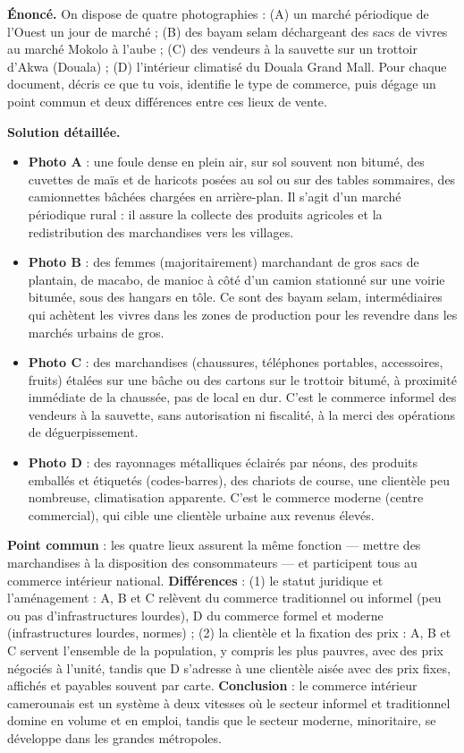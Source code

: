 \documentclass[11pt]{article}
\newcommand{\cle}[1]{{\popxbold\color{popdark}#1}}
\begin{document}
\begin{exoresolu}
\textbf{Énoncé.} On dispose de quatre photographies : (A) un marché périodique de l'Ouest un jour de marché ; (B) des bayam selam déchargeant des sacs de vivres au marché Mokolo à l'aube ; (C) des vendeurs à la sauvette sur un trottoir d'Akwa (Douala) ; (D) l'intérieur climatisé du Douala Grand Mall. Pour chaque document, décris ce que tu vois, identifie le type de commerce, puis dégage un point commun et deux différences entre ces lieux de vente.

\tcblower
\textbf{Solution détaillée.}
\begin{itemize}
\item \textbf{Photo A} : une foule dense en plein air, sur sol souvent non bitumé, des cuvettes de maïs et de haricots posées au sol ou sur des tables sommaires, des camionnettes bâchées chargées en arrière-plan. Il s'agit d'un \cle{marché périodique} rural : il assure la collecte des produits agricoles et la redistribution des marchandises vers les villages.
\item \textbf{Photo B} : des femmes (majoritairement) marchandant de gros sacs de plantain, de macabo, de manioc à côté d'un camion stationné sur une voirie bitumée, sous des hangars en tôle. Ce sont des \cle{bayam selam}, intermédiaires qui achètent les vivres dans les zones de production pour les revendre dans les marchés urbains de gros.
\item \textbf{Photo C} : des marchandises (chaussures, téléphones portables, accessoires, fruits) étalées sur une bâche ou des cartons sur le trottoir bitumé, à proximité immédiate de la chaussée, pas de local en dur. C'est le commerce informel des \cle{vendeurs à la sauvette}, sans autorisation ni fiscalité, à la merci des opérations de déguerpissement.
\item \textbf{Photo D} : des rayonnages métalliques éclairés par néons, des produits emballés et étiquetés (codes-barres), des chariots de course, une clientèle peu nombreuse, climatisation apparente. C'est le \cle{commerce moderne} (centre commercial), qui cible une clientèle urbaine aux revenus élevés.
\end{itemize}
\textbf{Point commun} : les quatre lieux assurent la même fonction — mettre des marchandises à la disposition des consommateurs — et participent tous au commerce intérieur national. \textbf{Différences} : (1) le statut juridique et l'aménagement : A, B et C relèvent du commerce traditionnel ou informel (peu ou pas d'infrastructures lourdes), D du commerce formel et moderne (infrastructures lourdes, normes) ; (2) la clientèle et la fixation des prix : A, B et C servent l'ensemble de la population, y compris les plus pauvres, avec des prix négociés à l'unité, tandis que D s'adresse à une clientèle aisée avec des prix fixes, affichés et payables souvent par carte. \textbf{Conclusion} : le commerce intérieur camerounais est un système à deux vitesses où le secteur informel et traditionnel domine en volume et en emploi, tandis que le secteur moderne, minoritaire, se développe dans les grandes métropoles.
\end{exoresolu}
\end{document}
